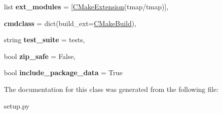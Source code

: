 \begin{DoxyCompactItemize}
list {\bfseries ext\+\_\+modules} = \mbox{[}\hyperlink{classsetup_1_1CMakeExtension}{C\+Make\+Extension}(\textquotesingle{}tmap/tmap\textquotesingle{})\mbox{]},
\item 
\mbox{\label{classsetup_1_1CMakeBuild_ac4b0e821c3961a4e452704cc4099048a}} 
{\bfseries cmdclass} = dict(build\+\_\+ext=\hyperlink{classsetup_1_1CMakeBuild}{C\+Make\+Build}),
\item 
\mbox{\label{classsetup_1_1CMakeBuild_af3b7e5c392fd67bd306dd5ac1300bb3e}} 
string {\bfseries test\+\_\+suite} = \textquotesingle{}tests\textquotesingle{},
\item 
\mbox{\label{classsetup_1_1CMakeBuild_a140e461d9a77c3914d2258458f6bd045}} 
bool {\bfseries zip\+\_\+safe} = False,
\item 
\mbox{\label{classsetup_1_1CMakeBuild_ae2844fb749058f067c8a9fbc75626742}} 
bool {\bfseries include\+\_\+package\+\_\+data} = True
\end{DoxyCompactItemize}


The documentation for this class was generated from the following file\+:\begin{DoxyCompactItemize}
\item 
setup.\+py\end{DoxyCompactItemize}
